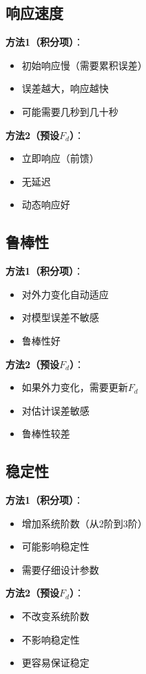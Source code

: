 \documentclass[12pt,a4paper]{article}
\begin{document}
\subsection{响应速度}

\textbf{方法1（积分项）}：
\begin{itemize}
\item 初始响应慢（需要累积误差）
\item 误差越大，响应越快
\item 可能需要几秒到几十秒
\end{itemize}

\textbf{方法2（预设$F_d$）}：
\begin{itemize}
\item 立即响应（前馈）
\item 无延迟
\item 动态响应好
\end{itemize}

\subsection{鲁棒性}

\textbf{方法1（积分项）}：
\begin{itemize}
\item 对外力变化自动适应
\item 对模型误差不敏感
\item 鲁棒性好
\end{itemize}

\textbf{方法2（预设$F_d$）}：
\begin{itemize}
\item 如果外力变化，需要更新$F_d$
\item 对估计误差敏感
\item 鲁棒性较差
\end{itemize}

\subsection{稳定性}

\textbf{方法1（积分项）}：
\begin{itemize}
\item 增加系统阶数（从2阶到3阶）
\item 可能影响稳定性
\item 需要仔细设计参数
\end{itemize}

\textbf{方法2（预设$F_d$）}：
\begin{itemize}
\item 不改变系统阶数
\item 不影响稳定性
\item 更容易保证稳定
\end{itemize}
\end{document}
